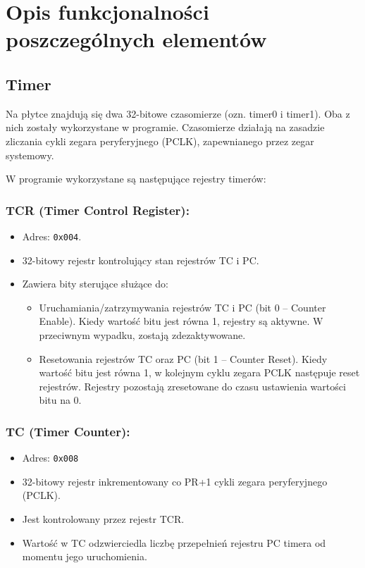 \documentclass[a4paper,12pt]{report}
\begin{document}
\chapter{Opis funkcjonalności poszczególnych elementów}

\section{Timer}
Na płytce znajdują się dwa 32-bitowe czasomierze (ozn. timer0 i timer1). Oba z nich zostały wykorzystane w programie. Czasomierze działają na zasadzie zliczania cykli zegara peryferyjnego (PCLK), zapewnianego przez zegar systemowy.

W programie wykorzystane są następujące rejestry timerów:

\subsection*{TCR (Timer Control Register):}
\begin{itemize}
    \item Adres: \texttt{0x004}.
    \item 32-bitowy rejestr kontrolujący stan rejestrów TC i PC.
    \item Zawiera bity sterujące służące do:
    \begin{itemize}
        \item Uruchamiania/zatrzymywania rejestrów TC i PC (bit 0 – Counter Enable). Kiedy wartość bitu jest równa 1, rejestry są aktywne. W przeciwnym wypadku, zostają zdezaktywowane.
        \item Resetowania rejestrów TC oraz PC (bit 1 – Counter Reset). Kiedy wartość bitu jest równa 1, w kolejnym cyklu zegara PCLK następuje reset rejestrów. Rejestry pozostają zresetowane do czasu ustawienia wartości bitu na 0.
    \end{itemize}
\end{itemize}

\subsection*{TC (Timer Counter):}
\begin{itemize}
    \item Adres: \texttt{0x008}
    \item 32-bitowy rejestr inkrementowany co PR+1 cykli zegara peryferyjnego (PCLK).
    \item Jest kontrolowany przez rejestr TCR.
    \item Wartość w TC odzwierciedla liczbę przepełnień rejestru PC timera od momentu jego uruchomienia.
\end{itemize}
\end{document}
